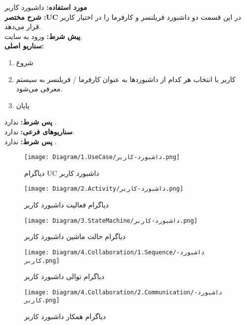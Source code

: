 \textbf{مورد استفاده:}
داشبورد کاربر
\\
\textbf{شرح مختصر :UC}
در این قسمت دو داشبورد فریلنسر و کارفرما را در اختیار کاربر قرار می‌دهد.
\\
\textbf{پيش شرط:}
ورود به سایت.
\\
\textbf{سناريو اصلی:}
\begin{enumerate}
\item
شروع
\item
کاربر با انتخاب هر کدام از داشبوردها به عنوان کارفرما / فریلنسر به سیستم معرفی می‌شود.
\item
پایان
\end{enumerate}

\noindent
\textbf{پس شرط:}
ندارد .
\\
\textbf{سناريوهای فرعی:}
ندارد.
\\
\textbf{پس شرط:}
ندارد .


\begin{figure}[H]
	\centering
	\texttt{[image: Diagram/1.UseCase/داشبورد-کاربر.png]}
	\caption{دیاگرام UC داشبورد کاربر‌}
	\label{fig:uc:داشبورد-کاربر}
\end{figure}
\begin{figure}[H]
	\texttt{[image: Diagram/2.Activity/داشبورد-کاربر.png]}
	\centering
	\caption{دیاگرام فعالیت ‌داشبورد کاربر}
	\label{fig:a:داشبورد-کاربر}
\end{figure}
\begin{figure}[H]
	\texttt{[image: Diagram/3.StateMachine/داشبورد-کاربر.png]}
	\centering
	\caption{دیاگرام حالت ماشین ‌داشبورد کاربر}
	\label{fig:sm:داشبورد-کاربر}
\end{figure}
\begin{figure}[H]
	\texttt{[image: Diagram/4.Collaboration/1.Sequence/داشبورد-کاربر.png]}
	\caption{دیاگرام توالی ‌داشبورد کاربر}
	\centering
	\label{fig:s:داشبورد-کاربر}
\end{figure}
\begin{figure}[H]
	\texttt{[image: Diagram/4.Collaboration/2.Communication/داشبورد-کاربر.png]}
	\centering
	\caption{دیاگرام همکار داشبورد کاربر}
	\label{fig:c:داشبورد-کاربر}
\end{figure}
